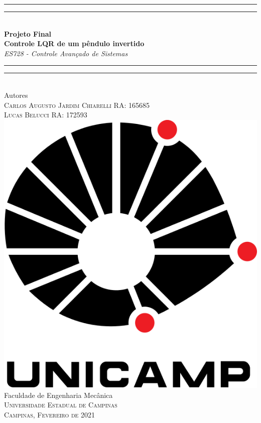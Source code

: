 \documentclass[a4paper]{article}
\begin{document}
\begin{titlepage}
\begin{center}
\vspace{25mm}
\rule[0.5ex]{\linewidth}{2pt}\vspace*{-\baselineskip}\vspace*{3.2pt}
\rule[0.5ex]{\linewidth}{1pt}\\[\baselineskip]
{\huge\textbf{Projeto Final\\Controle LQR de um pêndulo invertido}}\\[4mm]
{\Large \textit{ES728 - Controle Avançado de Sistemas}}\\
\rule[0.5ex]{\linewidth}{1pt}\vspace*{-\baselineskip}\vspace{4pt}
\rule[0.5ex]{\linewidth}{2pt}\\
\vspace{05mm}
{\large Autores}\\
\vspace{5mm}
{\large
\textsc{Carlos Augusto Jardim Chiarelli  \hfill RA: 165685\\}
\textsc{Lucas Belucci  \hfill RA: 172593\\}
}
\vspace{30mm}
\includegraphics[scale=0.3]{UNICAMP.png}\\
\vspace{6mm}
{\large Faculdade de Engenharia Mecânica\\
\textsc{Universidade Estadual de Campinas}}\\
\vspace{25mm}
{\large\textsc{Campinas, Fevereiro de 2021}}
\vspace{12mm}
\end{center}

\end{titlepage}
\end{document}

